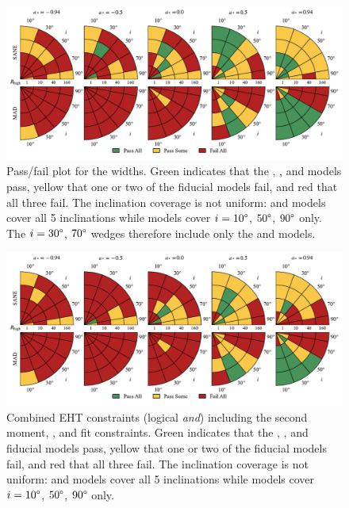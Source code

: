 \begin{figure}
 \centering
 \includegraphics[width=\textwidth]{./figures/Mring_w_Constraints.pdf}
  \caption{Pass/fail plot for the \mring widths.
    Green indicates that the \kharma, \bhac, and \hamr models pass, yellow that one or two of the fiducial models fail, and red that all three fail.
    The inclination coverage is not uniform: \bhac and \kharma models cover all 5 inclinations while \hamr models cover $i = 10\degree$, $50\degree$, $90\degree$ only.
    The $i = 30\degree$, $70\degree$ wedges therefore include only the \bhac and \kharma models.}
  \label{fig:mring_width_salsa}
\end{figure}

\begin{figure}
  \centering
  \includegraphics[width=\textwidth]{./figures/Interferometric_Constraints.pdf}
  \caption{Combined EHT constraints (logical {\em and}) including the second moment, \vam, and \mring fit constraints.
    Green indicates that the \kharma, \bhac, and \hamr fiducial models pass, yellow that one or two of the fiducial models fail, and red that all three fail.
    The inclination coverage is not uniform: \bhac and \kharma models cover all 5 inclinations while \hamr models cover $i = 10\degree$, $50\degree$, $90\degree$ only.}
  \label{fig:all_EHT_constraints}
\end{figure}

